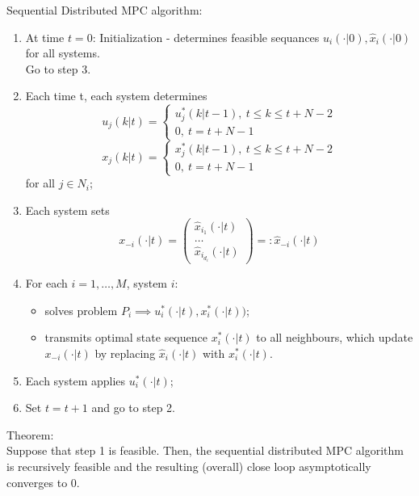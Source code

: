     Sequential Distributed MPC algorithm:
    \begin{enumerate}
        \item At time $t=0$: Initialization - determines feasible sequances $\hat u_i(\cdot|0), \hat x_i(\cdot|0)$ for all systems.\\
        Go to step 3.
        \item Each time t, each system determines
        $$u_j(k|t) = \left \{ \begin{array}{ll} u_j^*(k|t-1), \ t \le k \le t+N-2 \\ 0, \ t = t+N-1 \end{array} \right.$$
        $$x_j(k|t) = \left \{ \begin{array}{ll} x_j^*(k|t-1), \ t \le k \le t+N-2 \\ 0, \ t = t+N-1 \end{array} \right.$$
        for all $j \in N_i$;
        \item Each system sets
         $$x_{-i}(\cdot|t) = \begin{pmatrix} \hat x_{i_1}(\cdot|t) \\ \dots \\ \hat x_{i_{d_i}}(\cdot|t) \end{pmatrix} =: \hat x_{-i}(\cdot|t)$$
         \item For each $i=1, \dots, M$, system $i$:
         \begin{itemize}
             \item solves problem $P_i \implies u_i^*(\cdot|t),x_i^*(\cdot|t))$;
             \item transmits optimal state sequence $x_i^*(\cdot|t)$ to all neighbours, which update $x_{-i}(\cdot|t)$ by replacing $\hat x_i(\cdot|t)$ with $x_i^*(\cdot|t)$.
         \end{itemize}
         \item Each system applies $u_i^*(\cdot|t)$;
         \item Set $t=t+1$ and go to step 2.
    \end{enumerate}
    
    Theorem: \\
    Suppose that step 1 is feasible. Then, the sequential distributed MPC algorithm is recursively feasible and the resulting (overall) close loop asymptotically converges to 0.\\
    
